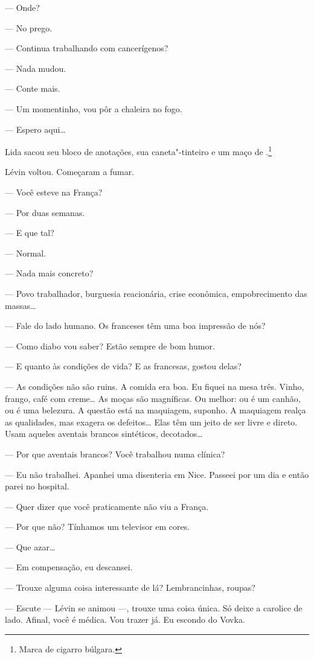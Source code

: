 --- Onde?

--- No prego.

--- Continua trabalhando com cancerígenos?

--- Nada mudou.

--- Conte mais.

--- Um momentinho, vou pôr a chaleira no fogo.

--- Espero aqui\ldots{}

Lida sacou seu bloco de anotações, sua caneta"-tinteiro e um maço de
.\footnote{Marca de cigarro búlgara.}

Lévin voltou. Começaram a fumar.

--- Você esteve na França?

--- Por duas semanas.

--- E que tal?

--- Normal.

--- Nada mais concreto?

--- Povo trabalhador, burguesia reacionária, crise econômica,
empobrecimento das massas\ldots{}

--- Fale do lado humano. Os franceses têm uma boa impressão de nós?

--- Como diabo vou saber? Estão sempre de bom humor.

--- E quanto às condições de vida? E as francesas, gostou delas?

--- As condições não são ruins. A comida era boa. Eu fiquei na mesa
três. Vinho, frango, café com creme\ldots{} As moças são magníficas. Ou
melhor: ou é um canhão, ou é uma belezura. A questão está na maquiagem,
suponho. A maquiagem realça as qualidades, mas exagera os defeitos\ldots{}
Elas têm um jeito de ser livre e direto. Usam aqueles aventais brancos
sintéticos, decotados\ldots{}

--- Por que aventais brancos? Você trabalhou numa clínica?

--- Eu não trabalhei. Apanhei uma disenteria em Nice. Passeei por um dia
e então parei no hospital.

--- Quer dizer que você praticamente não viu a França.

--- Por que não? Tínhamos um televisor em cores.

--- Que azar\ldots{}

--- Em compensação, eu descansei.

--- Trouxe alguma coisa interessante de lá? Lembrancinhas, roupas?

--- Escute --- Lévin se animou ---, trouxe uma coisa única. Só deixe a
carolice de lado. Afinal, você é médica. Vou trazer já. Eu escondo do
Vovka.

